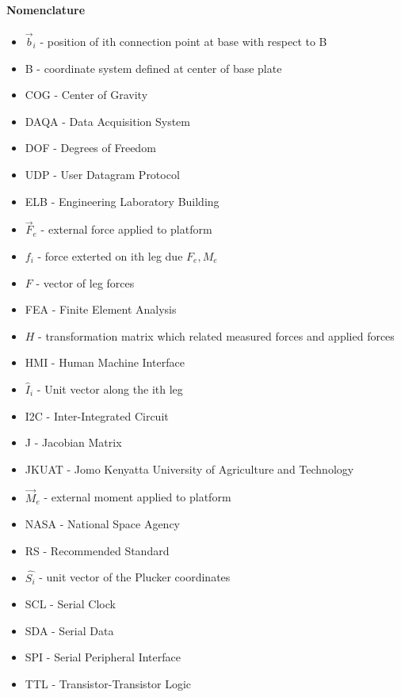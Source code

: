 \paragraph{Nomenclature}
\begin{itemize}
\item $\vec{b}_i$ - position of ith connection point at base with respect to B
\item B - coordinate system defined at center of base plate
\item COG - Center of Gravity
\item DAQA - Data Acquisition System
\item DOF - Degrees of Freedom
\item UDP - User Datagram Protocol
\item ELB - Engineering Laboratory Building
\item $\vec{F}_e$ - external force applied to platform
\item $f_i$ - force exterted on ith leg due $F_e, M_e$
\item $F$ - vector of leg forces
\item FEA - Finite Element Analysis
\item $H$ - transformation matrix which related measured forces and applied forces
\item HMI - Human Machine Interface
\item $\hat{I}_i$ - Unit vector along the ith leg 
\item I2C - Inter-Integrated Circuit 
\item J - Jacobian Matrix 
\item JKUAT - Jomo Kenyatta University of Agriculture and Technology
\item $\vec{M}_e$ - external moment applied to platform
\item NASA - National Space Agency
\item RS - Recommended Standard
\item $\hat{{S_{i}}}$ - unit vector of the Plucker coordinates
\item SCL - Serial Clock
\item SDA - Serial Data
\item SPI - Serial Peripheral Interface
\item TTL - Transistor-Transistor Logic
\end{itemize}
\pagebreak